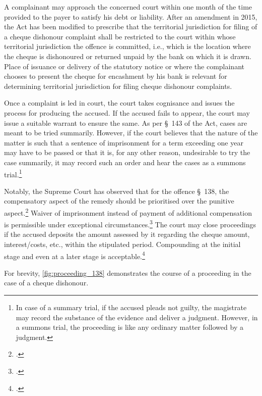 \documentclass[12pt,a4paper]{article}
\begin{document}
\begin{appendices}
A complainant may approach the concerned court within one month of the time provided to the payer to satisfy his debt or liability. After an amendment in 2015, the Act has been modified to prescribe that the territorial jurisdiction for filing of a cheque dishonour complaint shall be restricted to the court within whose territorial jurisdiction the offence is committed, i.e., which is the location where the cheque is dishonoured or returned unpaid by the bank on which it is drawn. Place of issuance or delivery of the statutory notice or where the complainant chooses to present the cheque for encashment by his bank is relevant for determining territorial jurisdiction for filing cheque dishonour complaints.

Once a complaint is led in court, the court takes cognisance and issues the process for producing the accused. If the accused fails to appear, the court may issue a suitable warrant to ensure the same. As per \S~143 of the Act, cases are meant to be tried summarily. However, if the court believes that the nature of the matter is such that a sentence of imprisonment for a term exceeding one year may have to be passed or that it is, for any other reason, undesirable to try the case summarily, it may record such an order and hear the cases as a summons trial.\footnote{In case of a summary trial, if the accused pleads not guilty, the magistrate may record the substance of the evidence and deliver a judgment. However, in a summons trial, the proceeding is like any ordinary matter followed by a judgment.}

Notably, the Supreme Court has observed that for the offence \S~138, the compensatory aspect of the remedy should be prioritised over the punitive aspect.\footcite{sc2010_damodar} Waiver of imprisonment instead of payment of additional compensation is permissible under exceptional circumstances.\footcite{sc2018_priyanka} The court may close proceedings if the accused deposits the amount assessed by it regarding the cheque amount, interest/costs, etc., within the stipulated period. Compounding at the initial stage and even at a later stage is acceptable.\footcite{sc2018_meters}

For brevity, \cref{fig:proceeding_138} demonstrates the course of a proceeding in the case of a cheque dishonour.


\end{appendices}
\end{document}
